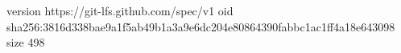 version https://git-lfs.github.com/spec/v1
oid sha256:3816d338bae9a1f5ab49b1a3a9e6dc204e80864390fabbc1ac1ff4a18e643098
size 498
